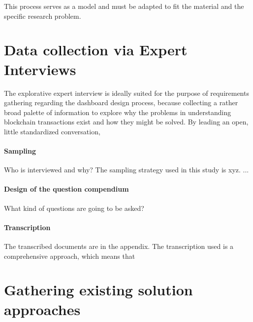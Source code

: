 This process serves as a model and must be adapted to fit the material and the specific research problem. 

\section{Data collection via Expert Interviews}

The explorative expert interview is ideally suited for the purpose of requirements gathering regarding the dashboard design process, because collecting a rather broad palette of information to explore why the problems in understanding blockchain transactions exist and how they might be solved. By leading an open, little standardized conversation,  

\paragraph{Sampling} Who is interviewed and why? The sampling strategy used in this study is xyz. ... 

\paragraph{Design of the question compendium} What kind of questions are going to be asked?

\paragraph{Transcription} The transcribed documents are in the appendix. The transcription used is a comprehensive approach, which means that 

\section{Gathering existing solution approaches}